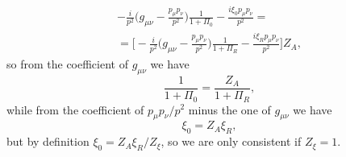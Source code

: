 \begin{multline}
    -\frac{i}{p^2}\bigg(g_{\mu\nu} - \frac{p_\mu p_\nu}{p^2}\bigg)\frac{1}{1 + \Pi_0} - \frac{i\xi_0 p_\mu p_\nu}{p^2} = \\
    = \bigg[-\frac{i}{p^2}\bigg(g_{\mu\nu} - \frac{p_\mu p_\nu}{p^2}\bigg)\frac{1}{1 + \Pi_R} - \frac{i\xi_R p_\mu p_\nu}{p^2}\bigg]Z_A,
\end{multline}
so from the coefficient of $g_{\mu\nu}$ we have
\begin{equation}
    \frac{1}{1 + \Pi_0} = \frac{Z_A}{1 + \Pi_R},
\end{equation}
while from the coefficient of $p_\mu p_\nu/p^2$ minus the one of $g_{\mu\nu}$ we have
\begin{equation}
    \xi_0 = Z_A\xi_R,
\end{equation}
but by definition $\xi_0 = Z_A\xi_R/Z_\xi$, so we are only consistent if $Z_\xi = 1$. 

